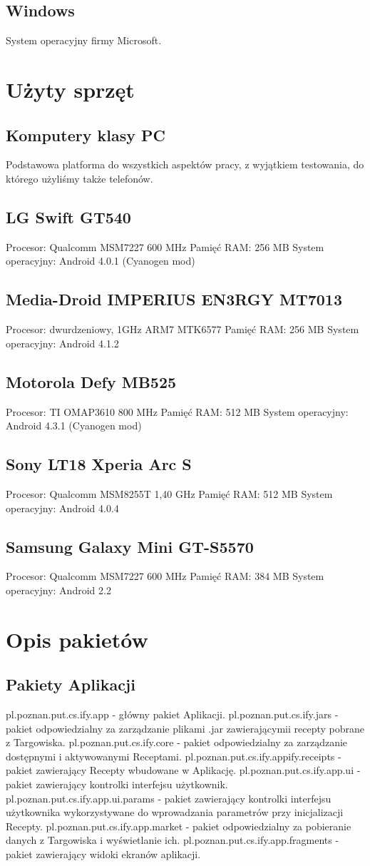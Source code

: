 \documentclass[11pt,a4paper,polish,thesis]{dcsbook}
\begin{document}
\subsection{Windows}
System operacyjny firmy Microsoft.
\section{Użyty sprzęt}
\subsection{Komputery klasy PC}
Podstawowa platforma do wszystkich aspektów pracy, z wyjątkiem testowania, do którego użyliśmy także telefonów.
\subsection{LG Swift GT540}
Procesor: Qualcomm MSM7227 600 MHz
Pamięć RAM: 256 MB
System operacyjny: Android 4.0.1 (Cyanogen mod)
\subsection{Media-Droid IMPERIUS EN3RGY MT7013}
Procesor: dwurdzeniowy, 1GHz ARM7 MTK6577
Pamięć RAM: 256 MB
System operacyjny: Android 4.1.2
\subsection{Motorola Defy MB525}
Procesor: TI OMAP3610 800 MHz
Pamięć RAM: 512 MB
System operacyjny: Android 4.3.1 (Cyanogen mod)
\subsection{Sony LT18 Xperia Arc S}
Procesor: Qualcomm MSM8255T 1,40 GHz
Pamięć RAM: 512 MB
System operacyjny: Android 4.0.4
\subsection{Samsung Galaxy Mini GT-S5570}
Procesor: Qualcomm MSM7227 600 MHz
Pamięć RAM: 384 MB
System operacyjny: Android 2.2

\section{Opis pakietów}
\subsection{Pakiety Aplikacji}
pl.poznan.put.cs.ify.app - główny pakiet Aplikacji.
pl.poznan.put.cs.ify.jars - pakiet odpowiedzialny za zarządzanie plikami .jar zawierającymii recepty pobrane z Targowiska.
pl.poznan.put.cs.ify.core - pakiet odpowiedzialny za zarządzanie dostępnymi i aktywowanymi Receptami.
pl.poznan.put.cs.ify.appify.receipts - pakiet zawierający Recepty wbudowane w Aplikację.
pl.poznan.put.cs.ify.app.ui - pakiet zawierający kontrolki interfejsu użytkownik.
pl.poznan.put.cs.ify.app.ui.params - pakiet zawierający kontrolki interfejsu użytkownika wykorzystywane do wprowadzania parametrów przy inicjalizacji Recepty.
pl.poznan.put.cs.ify.app.market - pakiet odpowiedzialny za pobieranie danych z Targowiska i wyświetlanie ich.
pl.poznan.put.cs.ify.app.fragments - pakiet zawierający widoki ekranów aplikacji.
\end{document}

